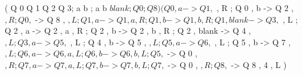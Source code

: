 ( Q 0 Q 1 Q 2 Q 3; a b ; a b $ blank ; Q 0 ; Q 8 )
( Q 0 , a -> Q 1 , $ , R
; Q 0 , b -> Q 2 , $ , R
; Q 0 , $ -> Q 8 , $ , L 
; Q 1 , a -> Q 1 , a , R
; Q 1 , b -> Q 1 , b , R
; Q 1 , blank -> Q 3 , $ , L
; Q 2 , a -> Q 2 , a , R
; Q 2 , b -> Q 2 , b , R
; Q 2 , blank -> Q 4 , $ , L
; Q 3 , a -> Q 5 , $ , L
; Q 4 , b -> Q 5 , $ , L
; Q 5 , a -> Q 6 , $ , L
; Q 5 , b -> Q 7 , $ , L
; Q 6 , a -> Q 6 , a , L
; Q 6 , b -> Q 6 , b , L
; Q 5 , $ -> Q 0 , $ , R
; Q 7 , a -> Q 7 , a , L
; Q 7 , b -> Q 7 , b , L
; Q 7 , $ -> Q 0 , $ , R
; Q 8 , $ -> Q 8 , 4 , L
)
